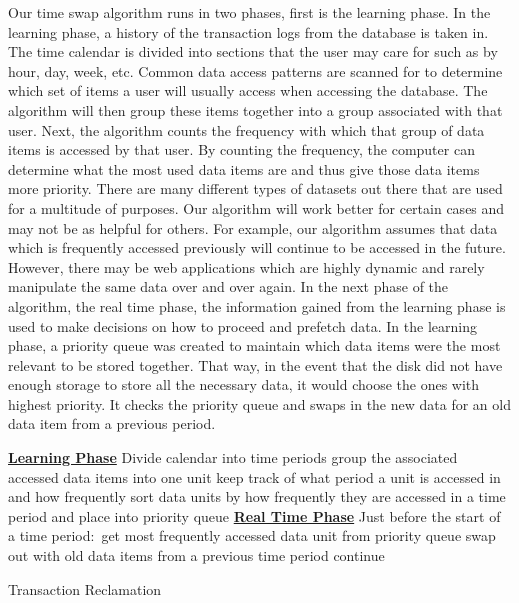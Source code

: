 \documentclass[10pt,final,journal]{IEEEtran}
\begin{document}
  Our time swap algorithm runs in two phases, first is the learning phase. In the learning phase, a history of the transaction logs from the database is taken in. The time calendar is divided into sections that the user may care for such as by hour, day, week, etc. Common data access patterns are scanned for to determine which set of items a user will usually access when accessing the database. The algorithm will then group these items together into a group associated with that user. Next, the algorithm counts the frequency with which that group of data items is accessed by that user. By counting the frequency, the computer can determine what the most used data items are and thus give those data items more priority. There are many different types of datasets out there that are used for a multitude of purposes. Our algorithm will work better for certain cases and may not be as helpful for others. For example, our algorithm assumes that data which is frequently accessed previously will continue to be accessed in the future. However, there may be web applications which are highly dynamic and rarely manipulate the same data over and over again.
	In the next phase of the algorithm, the real time phase, the information gained from the learning phase is used to make decisions on how to proceed and prefetch data. In the learning phase, a priority queue was created to maintain which data items were the most relevant to be stored together. That way, in the event that the disk did not have enough storage to store all the necessary data, it would choose the ones with highest priority. It checks the priority queue and swaps in the new data for an old data item from a previous period.

\begin{algorithm}
\underline{\textbf{Learning Phase}}\;
Divide calendar into time periods\;
 {
	group the associated accessed data items into one unit\;
	keep track of what period a unit is accessed in and how frequently\;
	sort data units by how frequently they are accessed in a time period and place into priority queue\;
}
\BlankLine
\BlankLine
\underline{\textbf{Real Time Phase}}\;
Just before the start of a time period$:$\;
get most frequently accessed data unit from priority queue\;
 {
	swap out with old data items from a previous time period\;
	}{
	continue
	}

\caption{Transaction Reclamation}
\label{reclaim}
\end{algorithm}
\end{document}
